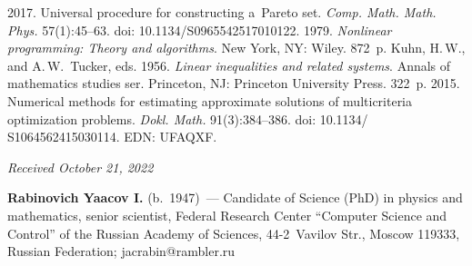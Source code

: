 


  

\vspace*{-5pt}

  \begin{multicols}{2}

\renewcommand{\bibname}{\protect\rmfamily References}

{\small\frenchspacing
 {%
 \begin{thebibliography}{9} 
 
 \vspace*{-1pt}
 
 2017. Universal procedure for constructing a~Pareto set. 
\textit{Comp. Math. Math. Phys.} 57(1):45--63. doi: 
10.1134/S0965542517010122.
 1979. \textit{Nonlinear programming: 
Theory and algorithms}. New York, NY: Wiley. 872~p.
Kuhn, H.\,W., and A.\,W.~Tucker, eds. 1956. \textit{Linear inequalities and 
related systems}. Annals of mathematics studies ser.  Princeton, NJ: Princeton University Press. 
322~p.
 2015. Numerical methods for estimating approximate 
solutions of multicriteria optimization problems. \textit{Dokl. Math.} 
91(3):384--386. doi: 10.1134/ S1064562415030114. EDN: UFAQXF.

\end{thebibliography}

 }
 }

\end{multicols}

\vspace*{-8pt}

\hfill{\small\textit{Received October 21, 2022}} 

\vspace*{-18pt}

\Contrl

\vspace*{-4pt}

\noindent
\textbf{Rabinovich Yaacov I.} (b.\ 1947)~--- Candidate of Science (PhD) in 
physics and mathematics, senior scientist, Federal Research Center ``Computer 
Science and Control'' of the Russian Academy of Sciences, 44-2~Vavilov Str., 
Moscow 119333, Russian Federation; \mbox{jacrabin@rambler.ru}

      





\label{end\stat}

\renewcommand{\bibname}{\protect\rm Литература} 